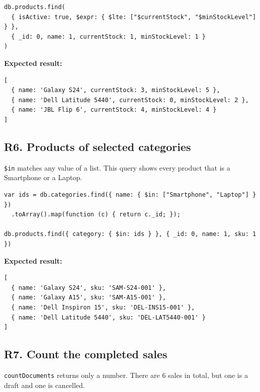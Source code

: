 \documentclass[11pt,a4paper]{article}
\newcommand{\code}[1]{\texttt{#1}}
\begin{document}
\begin{minipage}{\linewidth}
\begin{lstlisting}[style=query]
db.products.find(
  { isActive: true, $expr: { $lte: ["$currentStock", "$minStockLevel"] } },
  { _id: 0, name: 1, currentStock: 1, minStockLevel: 1 }
)
\end{lstlisting}
\end{minipage}

\noindent\textbf{Expected result:}
\begin{lstlisting}[style=result]
[
  { name: 'Galaxy S24', currentStock: 3, minStockLevel: 5 },
  { name: 'Dell Latitude 5440', currentStock: 0, minStockLevel: 2 },
  { name: 'JBL Flip 6', currentStock: 4, minStockLevel: 4 }
]
\end{lstlisting}

\subsection*{R6. Products of selected categories}
\code{\$in} matches any value of a list. This query shows every product that is a Smartphone or a Laptop.

\begin{minipage}{\linewidth}
\begin{lstlisting}[style=query]
var ids = db.categories.find({ name: { $in: ["Smartphone", "Laptop"] } })
  .toArray().map(function (c) { return c._id; });

db.products.find({ category: { $in: ids } }, { _id: 0, name: 1, sku: 1 })
\end{lstlisting}
\end{minipage}

\noindent\textbf{Expected result:}
\begin{lstlisting}[style=result]
[
  { name: 'Galaxy S24', sku: 'SAM-S24-001' },
  { name: 'Galaxy A15', sku: 'SAM-A15-001' },
  { name: 'Dell Inspiron 15', sku: 'DEL-INS15-001' },
  { name: 'Dell Latitude 5440', sku: 'DEL-LAT5440-001' }
]
\end{lstlisting}

\subsection*{R7. Count the completed sales}
\code{countDocuments} returns only a number. There are 6 sales in total, but one is a draft and one is cancelled.
\end{document}

